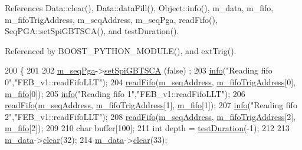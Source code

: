 References Data\+::clear(), Data\+::data\+Fill(), Object\+::info(), m\+\_\+data, m\+\_\+fifo, m\+\_\+fifo\+Trig\+Address, m\+\_\+seq\+Address, m\+\_\+seq\+Pga, read\+Fifo(), Seq\+P\+G\+A\+::set\+Spi\+G\+B\+T\+S\+C\+A(), and test\+Duration().



Referenced by B\+O\+O\+S\+T\+\_\+\+P\+Y\+T\+H\+O\+N\+\_\+\+M\+O\+D\+U\+L\+E(), and ext\+Trig().


\begin{DoxyCode}
200                                   \{
201 
202   \hyperlink{classFEB__v1_a6c7804ac86796f233a8393043adf2e77}{m\_seqPga}->\hyperlink{classSeqPGA_ae5449d6970bffd8de3670a8a1ce6942d}{setSpiGBTSCA} (\textcolor{keyword}{false}) ;
203   \hyperlink{classObject_a644fd329ea4cb85f54fa6846484b84a8}{info}(\textcolor{stringliteral}{"Reading fifo 0"},\textcolor{stringliteral}{"FEB\_v1::readFifoLLT"});
204   \hyperlink{classFEB__v1_af945f99a912c5ad076ebdb03dbb6c139}{readFifo}(\hyperlink{classFEB__v1_a1c1eb093fd1733b9510fcf8bc5c7ad08}{m\_seqAddress}, \hyperlink{classFEB__v1_ad41f8756c4e15815c6d5e35902cf2257}{m\_fifoTrigAddress}[0], 
      \hyperlink{classFEB__v1_ae5b770f2f5ffb97324862c93e3153985}{m\_fifo}[0]);
205   \hyperlink{classObject_a644fd329ea4cb85f54fa6846484b84a8}{info}(\textcolor{stringliteral}{"Reading fifo 1"},\textcolor{stringliteral}{"FEB\_v1::readFifoLLT"});
206   \hyperlink{classFEB__v1_af945f99a912c5ad076ebdb03dbb6c139}{readFifo}(\hyperlink{classFEB__v1_a1c1eb093fd1733b9510fcf8bc5c7ad08}{m\_seqAddress}, \hyperlink{classFEB__v1_ad41f8756c4e15815c6d5e35902cf2257}{m\_fifoTrigAddress}[1], 
      \hyperlink{classFEB__v1_ae5b770f2f5ffb97324862c93e3153985}{m\_fifo}[1]);
207   \hyperlink{classObject_a644fd329ea4cb85f54fa6846484b84a8}{info}(\textcolor{stringliteral}{"Reading fifo 2"},\textcolor{stringliteral}{"FEB\_v1::readFifoLLT"});
208   \hyperlink{classFEB__v1_af945f99a912c5ad076ebdb03dbb6c139}{readFifo}(\hyperlink{classFEB__v1_a1c1eb093fd1733b9510fcf8bc5c7ad08}{m\_seqAddress}, \hyperlink{classFEB__v1_ad41f8756c4e15815c6d5e35902cf2257}{m\_fifoTrigAddress}[2], 
      \hyperlink{classFEB__v1_ae5b770f2f5ffb97324862c93e3153985}{m\_fifo}[2]);
209   
210   \textcolor{keywordtype}{char} buffer[100];
211   \textcolor{keywordtype}{int} depth = \hyperlink{classFEB__v1_a7f1db8ca9490172fce7603da9e703dec}{testDuration}(-1);
212 
213   \hyperlink{classFEB__v1_a1c9dbc3660021dba1f58666d0097abb0}{m\_data}->\hyperlink{classData_acdda95480997a3d6245799810334739d}{clear}(32);
214   \hyperlink{classFEB__v1_a1c9dbc3660021dba1f58666d0097abb0}{m\_data}->\hyperlink{classData_acdda95480997a3d6245799810334739d}{clear}(33);

\end{DoxyCode}

